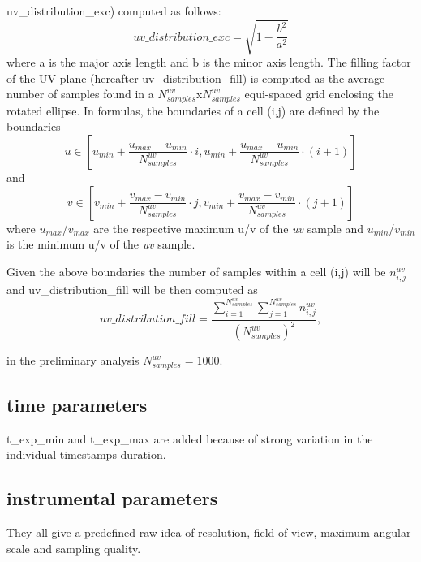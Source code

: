 \documentclass[11pt,a4paper]{ivoa}
\begin{document}
uv\_distribution\_exc) computed as follows:
\begin{equation}
uv\_distribution\_exc = \sqrt{1-\frac{b^2}{a^2}}
\end{equation}
where a is the major axis length and b is the minor axis length.
The filling factor of the UV plane (hereafter uv\_distribution\_fill) is computed as the average 
number of samples found in a $N^{uv}_{samples}$x$N^{uv}_{samples}$ equi-spaced grid enclosing the 
rotated ellipse. In formulas, the boundaries of a cell (i,j) are defined by the boundaries
\begin{equation}
u \in [u_{min} + \frac{u_{max} - u_{min}}{N^{uv}_{samples}} \cdot i , u_{min} + \frac{u_{max} - 
u_{min}}{N^{uv}_{samples}} \cdot (i + 1)]
\end{equation} 
and
\begin{equation}
v \in [v_{min} + \frac{v_{max} - v_{min}}{N^{uv}_{samples}} \cdot j , v_{min} + \frac{v_{max} - 
v_{min}}{N^{uv}_{samples}} \cdot (j + 1)]
\end{equation} 
where $u_{max}$/$v_{max}$ are the respective maximum u/v of the \emph{uv} sample and 
$u_{min}$/$v_{min}$ is the minimum u/v of the \emph{uv} sample.

Given the above boundaries the number of samples within a cell (i,j) will be $n^{uv}_{i,j}$ 
and uv\_distribution\_fill will be then computed as 
\begin{equation}
uv\_distribution\_fill = \frac{\sum^{N^{uv}_{samples}}_{i=1} \sum^{N^{uv}_{samples}}_{j=1} 
n^{uv}_{i,j} }{(N^{uv}_{samples}) ^ 2},
\end{equation}

in the preliminary analysis $N^{uv}_{samples} = 1000$.



\subsection{time parameters}

t\_exp\_min and t\_exp\_max are added because of strong variation in the individual timestamps 
duration.
\subsection{instrumental parameters}

They all give a predefined raw idea of resolution, field of view, maximum angular scale and 
sampling quality.
\end{document}
